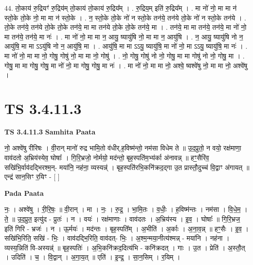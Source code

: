 \documentclass[17pt]{extarticle}
\begin{document}
44. तो॒काय॑ रु॒द्रियꣳ॑ रु॒द्रिय॑म् तो॒काय॑ तो॒काय॑ रु॒द्रिय᳚म् । . रु॒द्रिय॒म् इति॑ रु॒द्रिय᳚म् । . मा नो॑ नो॒ मा मा न॑ स्तो॒के तो॒के नो॒ मा मा न॑ स्तो॒के । . न॒ स्तो॒के तो॒के नो॑ न स्तो॒के तन॑ये॒ तन॑ये तो॒के नो॑ न स्तो॒के तन॑ये । . तो॒के तन॑ये॒ तन॑ये तो॒के तो॒के तन॑ये॒ मा मा तन॑ये तो॒के तो॒के तन॑ये॒ मा । . तन॑ये॒ मा मा तन॑ये॒ तन॑ये॒ मा नो॑ नो॒ मा तन॑ये॒ तन॑ये॒ मा नः॑ । . मा नो॑ नो॒ मा मा न॒ आयु॒ ष्यायु॑षि नो॒ मा मा न॒ आयु॑षि । . न॒ आयु॒ ष्यायु॑षि नो न॒ आयु॑षि॒ मा मा ऽऽयु॑षि नो न॒ आयु॑षि॒ मा । . आयु॑षि॒ मा मा ऽऽयु॒ ष्यायु॑षि॒ मा नो॑ नो॒ मा ऽऽयु॒ ष्यायु॑षि॒ मा नः॑ । . मा नो॑ नो॒ मा मा नो॒ गोषु॒ गोषु॑ नो॒ मा मा नो॒ गोषु॑ । . नो॒ गोषु॒ गोषु॑ नो नो॒ गोषु॒ मा मा गोषु॑ नो नो॒ गोषु॒ मा । . गोषु॒ मा मा गोषु॒ गोषु॒ मा नो॑ नो॒ मा गोषु॒ गोषु॒ मा नः॑ । . मा नो॑ नो॒ मा मा नो॒ अश्वे॒ ष्वश्वे॑षु नो॒ मा मा नो॒ अश्वे॑षु । \newline
\pagebreak
{}

\section{ TS 3.4.11.3 }

\textbf{TS 3.4.11.3 } \newline
\textbf{Samhita Paata} \newline

नो॒ अश्वे॑षु रीरिषः । वी॒रान् मानो॑ रुद्र भामि॒तो व॑धीर्.ह॒विष्म॑न्तो॒ नम॑सा विधेम ते ॥ उ॒द॒प्रुतो॒ न वयो॒ रक्ष॑माणा॒ वाव॑दतो अ॒भ्रिय॑स्येव॒ घोषाः᳚ । गि॒रि॒भ्रजो॒ नोर्मयो॒ मद॑न्तो॒ बृह॒स्पति॑म॒भ्य॑र्का अ॑नावन्न् ॥ हꣳ॒॒सैरि॑व॒ सखि॑भि॒र्वाव॑दद्भिरश्म॒न्- मया॑नि॒ नह॑ना॒ व्यस्यन्न्॑ । बृह॒स्पति॑रभि॒कनि॑क्रद॒द्गा उ॒त प्रास्तौ॒दुच्च॑ वि॒द्वाꣳ अ॑गायत् ॥एन्द्र॑ सान॒सिꣳ र॒यिꣳ - [  ] \newline

\textbf{Pada Paata} \newline

नः॒ । अश्वे॑षु । री॒रि॒षः॒ ॥ वी॒रान् । मा । नः॒ । रु॒द्र॒ । भा॒मि॒तः । व॒धीः॒ । ह॒विष्म॑न्तः । नम॑सा । वि॒धे॒म॒ । ते॒ ॥ उ॒द॒प्रुत॒ इत्यु॑द - प्रुतः॑ । न । वयः॑ । रक्ष॑माणाः । वाव॑दतः । अ॒भ्रिय॑स्य । इ॒व॒ । घोषाः᳚ ॥ गि॒रि॒भ्रज॒ इति॑ गिरि - भ्रजः॑ । न । ऊ॒र्मयः॑ । मद॑न्तः । बृह॒स्पति᳚म् । अ॒भीति॑ । अ॒र्काः । अ॒ना॒व॒न्न् ॥ हꣳ॒॒सैः । इ॒व॒ । सखि॑भि॒रिति॒ सखि॑ - भिः॒ । वाव॑दद्भि॒रिति॒ वाव॑दत्- भिः॒ । अ॒श्म॒न्मया॒नीत्य॑श्मन्न् - मया॑नि । नह॑ना । व्यस्य॒न्निति॑ वि-अस्यन्न्॑ ॥ बृह॒स्पतिः॑ । अ॒भि॒कनि॑क्रद॒दित्य॑भि - कनि॑क्रदत् । गाः । उ॒त । प्रेति॑ । अ॒स्तौ॒त् । उदिति॑ । च॒ । वि॒द्वान् । अ॒गा॒य॒त् ॥ एति॑ । इ॒न्द्र॒ । सा॒न॒सिम् । र॒यिम् ।  \newline
\end{document}
